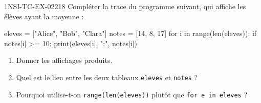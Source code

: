 \begin{exercice}{1NSI-TC-EX-022}{1}{8}
Compléter la trace du programme suivant, qui affiche les élèves ayant la moyenne :
\begin{python}
eleves = ["Alice", "Bob", "Clara"]
notes = [14, 8, 17]
for i in range(len(eleves)):
    if notes[i] >= 10:
        print(eleves[i], ":", notes[i])
\end{python}
\begin{enumerate}
  \item Donner les affichages produits.
  \item Quel est le lien entre les deux tableaux \lstinline{eleves} et \lstinline{notes} ?
  \item Pourquoi utilise-t-on \lstinline{range(len(eleves))} plutôt que
        \lstinline{for e in eleves} ?
\end{enumerate}
\end{exercice}
